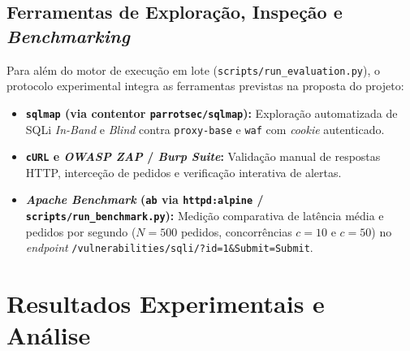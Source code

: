 \documentclass[11pt,a4paper]{article}
\begin{document}
\subsection{Ferramentas de Exploração, Inspeção e \textit{Benchmarking}}
Para além do motor de execução em lote (\texttt{scripts/run\_evaluation.py}), o protocolo experimental integra as ferramentas previstas na proposta do projeto:
\begin{itemize}
    \item \textbf{\texttt{sqlmap} (via contentor \texttt{parrotsec/sqlmap}):} Exploração automatizada de SQLi \textit{In-Band} e \textit{Blind} contra \texttt{proxy-base} e \texttt{waf} com \textit{cookie} autenticado.
    \item \textbf{\texttt{cURL} e \textit{OWASP ZAP} / \textit{Burp Suite}:} Validação manual de respostas HTTP, interceção de pedidos e verificação interativa de alertas.
    \item \textbf{\textit{Apache Benchmark} (\texttt{ab} via \texttt{httpd:alpine} / \texttt{scripts/run\_benchmark.py}):} Medição comparativa de latência média e pedidos por segundo ($N=500$ pedidos, concorrências $c=10$ e $c=50$) no \textit{endpoint} \texttt{/vulnerabilities/sqli/?id=1\&Submit=Submit}.
\end{itemize}

\clearpage
\section{Resultados Experimentais e Análise}
\label{sec:resultados}
\end{document}
